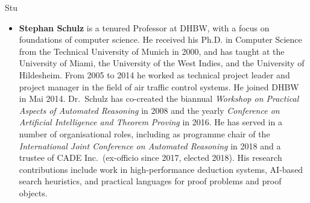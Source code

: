 \begin{sitedescription}{Stu}
\begin{itemize}
\item
\textbf{Stephan Schulz} is a tenured Professor at DHBW, with a focus
on foundations of computer science. He received his Ph.D. in Computer
Science from the Technical University of Munich in 2000, and has
taught at the University of Miami, the University of the West Indies,
and the University of Hildesheim. From 2005 to 2014 he worked as
technical project leader and project manager in the field of air
traffic control systems. He joined DHBW in Mai 2014. Dr.\ Schulz has
co-created the biannual \emph{Workshop on Practical Aspects of
  Automated Reasoning} in 2008 and the yearly \emph{Conference on
  Artificial Intelligence and Theorem Proving} in 2016. He has served
in a number of organisational roles, including as programme chair of the
\emph{International Joint Conference on Automated Reasoning} in 2018
and a trustee of CADE Inc.\ (ex-officio since 2017, elected 2018). His
research contributions include work in high-performance deduction
systems, AI-based search heuristics, and practical languages for proof
problems and proof objects.
\end{itemize}

\end{sitedescription}

